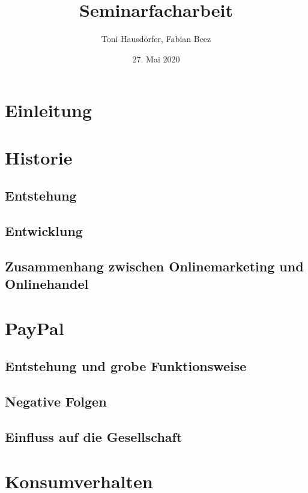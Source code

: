 \documentclass[a4paper, 12pt]{scrartcl}
\title{Seminarfacharbeit}
\author{Toni Hausdörfer, Fabian Beez}
\date{27. Mai 2020}
\begin{document}
    
    
    

    \tableofcontents 
        \newpage

    \section{Einleitung}
        
        \newpage
    
    
    
    \section{Historie}
        \subsection{Entstehung}
        \subsection{Entwicklung}
        \subsection{Zusammenhang zwischen Onlinemarketing und Onlinehandel}
        \newpage
        
        
        
    \section{PayPal}
		
        \subsection{Entstehung und grobe Funktionsweise}
        \subsection{Negative Folgen}
        \subsection{Einfluss auf die Gesellschaft}
        \newpage
        
        
        
    \section{Konsumverhalten}
            
\end{document}
